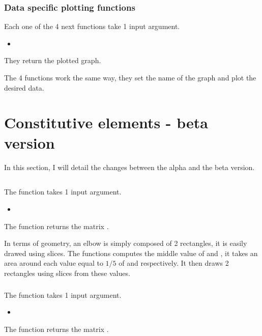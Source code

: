 \subsubsection{Data specific plotting functions}
Each one of the 4 next functions take 1 input argument.
\begin{itemize}
      \item {}
\end{itemize}
They return the plotted graph.

The 4 functions work the same way, they set the name of the graph and plot the
desired data.

\section{Constitutive elements - beta version}
In this section, I will detail the changes between the alpha and the beta
version.

\subsection{}
\subsubsection{}
The function \textcolor{func}{} takes 1 input argument.
\begin{itemize}
      \item {} \textcolor{dtype}{}
\end{itemize}
The function returns the matrix .

In terms of geometry, an elbow is simply composed of 2 rectangles, it is easily
drawed using slices. The functions computes the middle value of  and
, it takes an area around each value equal to $1/5$ of  and
 respectively. It then draws 2 rectangles using slices from these
values.

\subsubsection{}
The function \textcolor{func}{} takes 1 input argument.
\begin{itemize}
      \item {} \textcolor{dtype}{}
\end{itemize}
The function returns the matrix .

